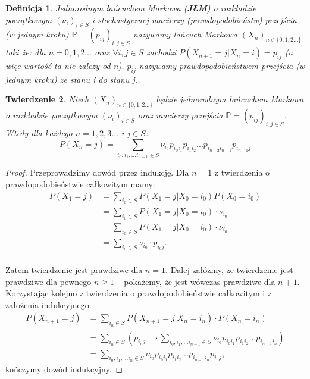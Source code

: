 \documentclass[a4paper]{article}
\theoremstyle{defn}
\newtheorem{defn}{Definicja}[subsection]
\theoremstyle{theorem}
\newtheorem{theorem}[defn]{Twierdzenie}
\theoremstyle{lemma}
\theoremstyle{cor}
\theoremstyle{fact}
\begin{document}
\begin{defn}\label{defn2.1.9}
\textit{Jednorodnym łańcuchem Markowa} (\textbf{JŁM}) o rozkładzie początkowym $(\nu_i)_{i \in S}$ i stochastycznej \textit{macierzy (prawdopodobieństw) przejścia (w jednym kroku)} $\mathbb{P} = (p_{ij})_{i, j \in S}$ nazywamy łańcuch Markowa $(X_n)_{n \in \{0,1,2...\}}$, taki że: dla $n = 0,1,2...$ oraz $\forall i,j \in S$ zachodzi $P(X_{n+1} = j|X_n = i) = p_{ij}$ (a więc wartość ta nie zależy od \textit{n}). $p_{ij}$ nazywamy \textit{prawdopodobieństwem przejścia (w jednym kroku)} ze stanu \textit{i} do stanu \textit{j}.
\end{defn}
\begin{theorem}\label{theorem2.1.10}
Niech $(X_n)_{n \in \{0,1,2...\}}$ będzie jednorodnym łańcuchem Markowa o rozkładzie początkowym $(\nu_i)_{i \in S}$ oraz macierzy przejścia $\mathbb{P} = (p_{ij})_{i,j \in S}$. Wtedy dla każdego $n = 1,2,3...$ i $j \in S$:\\
$$P(X_n = j) = \sum\limits_{i_0, i_1,... i_{n-1} \in S} \nu_{i_0} p_{i_{0}i_{1}} p_{i_{1}i_{2}} ... p_{i_{n-2}i_{n-1}}p_{i_{n-1}j}$$
\end{theorem}
\begin{proof}Przeprowadzimy dowód przez indukcję. Dla $n=1$ z twierdzenia o prawdopodobieństwie całkowitym mamy:
\begin{align*}
P(X_1 = j) &= \sum\limits_{i_0 \in S} P(X_1 = j | X_0 = i_0)P(X_0 = i_0)\\
&= \sum\limits_{i_0 \in S} P(X_1 = j | X_0 = i_0) \cdot \nu_{i_0} \\
&= \sum\limits_{i_0 \in S} P(X_1 = j | X_0 = i_0) \cdot \nu_{i_0} \\
&= \sum\limits_{i_0 \in S}  \nu_{i_0} \cdot p_{i_0j}.
\end{align*}
\\Zatem twierdzenie jest prawdziwe dla $n=1$. Dalej załóżmy, że twierdzenie jest prawdziwe dla pewnego $n \geq 1$ – pokażemy, że jest wówczas prawdziwe dla $n+1$. Korzystając kolejno z twierdzenia o prawdopodobieństwie całkowitym i z założenia indukcyjnego:
\begin{align*}P(X_{n+1} = j) &= \sum\limits_{i_{n} \in S} P(X_{n+1} = j|X_n = i_n)\cdot P(X_n = i_n) \\
&= \sum\limits_{i_n \in S}\left(p_{i_nj} \quad \cdot \sum\limits_{i_0, i_1, ... i_{n-1} \in S} \nu_{i_0} p_{i_{0}i_{1}} p_{i_{1}i_{2}} ... p_{i_{n-1}i_n}\right) \\
&= \sum\limits_{i_0, i_1,... i_n \in S} \nu_{i_0} p_{i_{0}i_{1}} p_{i_{1}i_{2}} ... p_{i_{n-1}i_n}p_{i_{n}j},
\end{align*}
kończymy dowód indukcyjny.
\end{proof}
\end{document}
